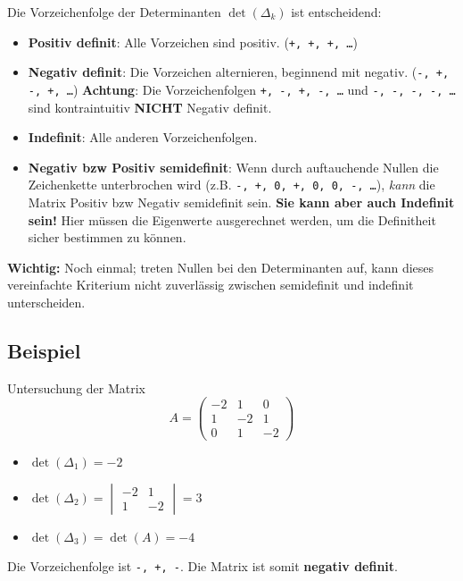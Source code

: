 Die Vorzeichenfolge der Determinanten \(\det(\Delta_k)\) ist entscheidend:
\begin{itemize}
    \item \textbf{Positiv definit}: Alle Vorzeichen sind positiv. (\texttt{+, +, +, \dots})
    \item \textbf{Negativ definit}: Die Vorzeichen alternieren, beginnend mit negativ. (\texttt{-, +, -, +, \dots}) \newline
            \textbf{Achtung}: Die Vorzeichenfolgen \texttt{+, -, +, -, \dots} und \texttt{-, -, -, -, \dots} sind kontraintuitiv \textbf{NICHT} Negativ definit.
    \item \textbf{Indefinit}: Alle anderen Vorzeichenfolgen.
    \item \textbf{Negativ bzw Positiv semidefinit}: Wenn durch auftauchende Nullen die Zeichenkette unterbrochen wird (z.B. \texttt{-, +, 0, +, 0, 0, -, \dots}), \textit{kann} die Matrix Positiv bzw Negativ semidefinit sein. \textbf{Sie kann aber auch Indefinit sein!} Hier müssen die Eigenwerte ausgerechnet werden, um die Definitheit sicher bestimmen zu können.
\end{itemize}
\textbf{Wichtig:} Noch einmal; treten Nullen bei den Determinanten auf, kann dieses vereinfachte Kriterium nicht zuverlässig zwischen semidefinit und indefinit unterscheiden.

\subsection{Beispiel}
Untersuchung der Matrix \[ A = \begin{pmatrix} -2 & 1 & 0 \\ 1 & -2 & 1 \\ 0 & 1 & -2 \end{pmatrix} \]
\begin{itemize}
    \item \(\det(\Delta_1) = -2\)
    \item \(\det(\Delta_2) = \begin{vmatrix} -2 & 1 \\ 1 & -2 \end{vmatrix} = 3\)
    \item \(\det(\Delta_3) = \det(A) = -4\)
\end{itemize}
Die Vorzeichenfolge ist \texttt{-, +, -}. Die Matrix ist somit \textbf{negativ definit}.